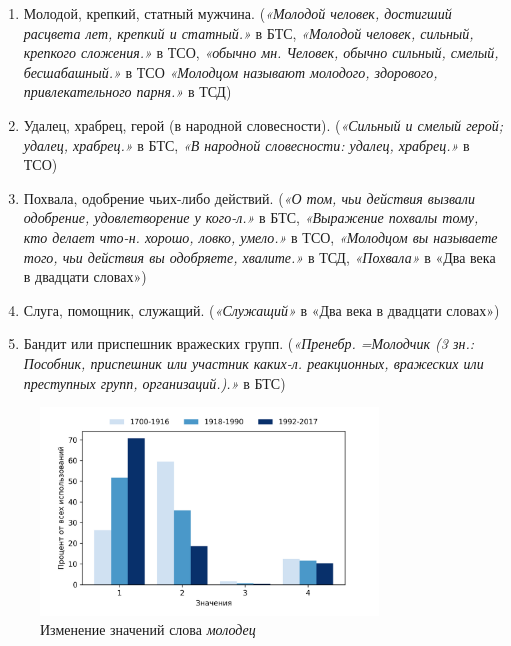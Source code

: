 \begin{enumerate}
    \item Молодой, крепкий, статный мужчина.
    (\textit{«Молодой человек, достигший расцвета лет, крепкий и статный.»} в БТС,
    \textit{«Молодой человек, сильный, крепкого сложения.»} в ТСО,  %
    \textit{«обычно мн. Человек, обычно сильный, смелый, бесшабашный.»} в ТСО
    \textit{«Молодцом называют молодого, здорового, привлекательного парня.»} в ТСД)

    \item Удалец, храбрец, герой (в народной словесности).
    (\textit{«Сильный и смелый герой; удалец, храбрец.»} в БТС,
    \textit{«В народной словесности: удалец, храбрец.»} в ТСО)

    \item Похвала, одобрение чьих-либо действий.
    (\textit{«О том, чьи действия вызвали одобрение, удовлетворение у кого-л.»} в БТС,
    \textit{«Выражение похвалы тому, кто делает что-н. хорошо, ловко, умело.»} в ТСО,
    \textit{«Молодцом вы называете того, чьи действия вы одобряете, хвалите.»} в ТСД,
    \textit{«Похвала»} в «Два века в двадцати словах»)

    \item Слуга, помощник, служащий.
(\textit{«Служащий»} в «Два века в двадцати словах»)

    \item Бандит или приспешник вражеских групп.
(\textit{«Пренебр. =Молодчик (3 зн.: Пособник, приспешник или участник каких-л. реакционных,
вражеских или преступных групп, организаций.).»} в БТС)
\end{enumerate}


\begin{figure}[H]
	\centering
	\includegraphics[width=0.8\textwidth]{img/visualizations/molodets_minimal}
	\caption{Изменение значений слова \textit{молодец}}
	\label{fig:Молодец}
\end{figure}

